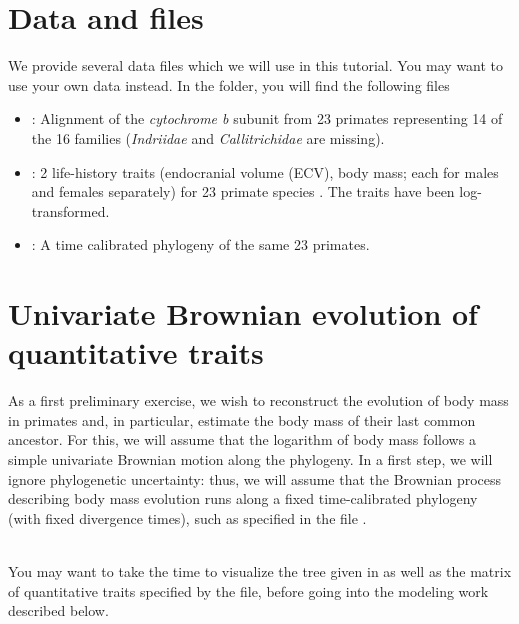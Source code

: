 \section{Data and files}

We provide several data files which we will use in this tutorial.
You may want to use your own data instead.
In the  folder, you will find the following files
\begin{itemize}
\item
{}: Alignment of the \textit{cytochrome b} subunit from 23 primates representing 14 of the 16 families (\textit{Indriidae} and \textit{Callitrichidae} are missing).

\item
{}: 2 life-history traits (endocranial volume (ECV), body mass; each for males and females separately)  for 23 primate species \citep[taken from the Anage database,][]{DeMagalhaes2009}. The traits have been log-transformed.

\item
{}: A time calibrated phylogeny of the same 23 primates.
\end{itemize}





\section{Univariate Brownian evolution of quantitative traits}

\label{univariate}

As a first preliminary exercise, we wish to reconstruct the evolution of body mass in primates and, in particular, estimate the body mass of their last common ancestor.
For this, we will assume that the logarithm of body mass follows a simple univariate Brownian motion along the phylogeny.
In a first step, we will ignore phylogenetic uncertainty:
thus, we will assume that the Brownian process describing body mass evolution runs along a fixed time-calibrated phylogeny (with fixed divergence times), such as specified in the file .

\noindent \\ \impmark You may want to take the time to visualize the tree given in  as well as the matrix of quantitative traits specified by the  file, before going into the modeling work described below.


